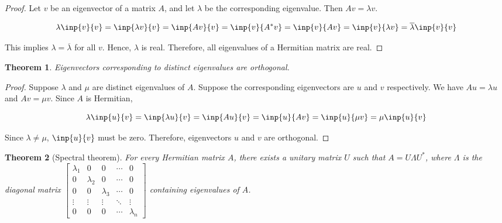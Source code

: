 \documentclass[twoside]{article}
\newcommand*\conj[1]{\overline{#1}}
\newcommand*\adj[1]{#1^*}
\theoremstyle{plain}
\newtheorem{theorem}{Theorem}
\theoremstyle{definition}
\theoremstyle{remark}
\begin{document}
\begin{proof}
Let \(v\) be an eigenvector of a matrix \(A\), and let \(\lambda\) be the corresponding eigenvalue. Then \(Av = \lambda v\). 

\[ \lambda\inp{v}{v} = \inp{\lambda v}{v} =  \inp{Av}{v} = \inp{v}{\adj{A}v} = \inp{v}{Av} = \inp{v}{\lambda v} = \conj{\lambda} \inp{v}{v}\]

This implies \(\lambda = \conj{\lambda}\) for all \(v\). Hence, \(\lambda\) is real. Therefore, all eigenvalues of a Hermitian matrix are real.
 \end{proof}



\begin{theorem} Eigenvectors corresponding to distinct eigenvalues are orthogonal.\end{theorem}

\begin{proof} Suppose \(\lambda\) and \(\mu\) are distinct eigenvalues of \(A\). Suppose the corresponding eigenvectors are \(u\) and \(v\) respectively. We have \(Au = \lambda u\) and \(Av = \mu v\). Since \(A\) is Hermitian, 

\[ \lambda \inp{u}{v} = \inp{\lambda u}{v} = \inp{A u}{v} = \inp{u}{Av} = \inp{u}{\mu v} = \mu \inp{u}{v} \]

Since \(\lambda \ne \mu\), \(\inp{u}{v}\) must be zero. Therefore, eigenvectors \(u\) and \(v\) are orthogonal.

\end{proof}




\begin{theorem}[Spectral theorem]  For every Hermitian matrix \(A\), there exists a unitary matrix \(U\) such that \(A = U \Lambda \adj{U}\), where \(\Lambda\) is the diagonal matrix \(\begin{bmatrix}
\lambda_1 & 0 & 0 & \cdots & 0\\
0 & \lambda_2 & 0 & \cdots & 0\\
0 & 0 & \lambda_3 & \cdots & 0\\
\vdots & \vdots & \vdots & \ddots & \vdots \\
0 & 0 & 0 & \cdots & \lambda_n \end{bmatrix}\) containing eigenvalues of \(A\). \end{theorem}
\end{document}
